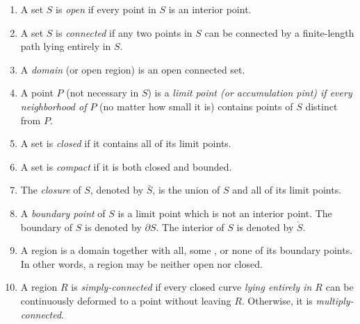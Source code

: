 \begin{enumerate}
\item
A set $S$ is \emph{open} if every point in $S$ is an interior point. 

\item
A set $S$ is \emph{connected} if any two points in $S$ can be connected by a finite-length path lying entirely in $S$. 

\item
A \emph{domain} (or open region) is an open connected set. 

\item
A point $P$ (not necessary in $S$) is a \emph{limit point (or accumulation pint) if every neighborhood of $P$} (no matter how small it is) contains points of $S$ distinct from $P$. 

\item
A set is \emph{closed} if it contains all of its limit points. 

\item
A set is \emph{compact} if it is both closed and bounded. 

\item
The \emph{closure} of $S$, denoted by $\bar{S}$, is the union of $S$ and all of its limit points. 

\item
A \emph{boundary point} of $S$ is a limit point which is not an interior point. The boundary of $S$ is denoted by $\partial S$. The interior of $S$ is denoted by $\mathring{S}$. 

\item
A region is a domain together with all, some , or none of its boundary points. In other words, a region may be neither open nor closed. 

\item
A region $R$ is \emph{simply-connected} if every closed curve \emph{lying entirely in $R$} can be continuously deformed to a point without leaving $R$. Otherwise, it is \emph{multiply-connected}. 


\end{enumerate}